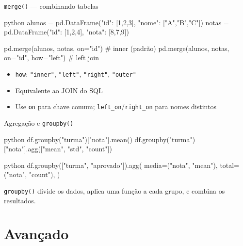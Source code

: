 \documentclass[xcolor=dvipsnames,t,aspectratio=169]{beamer}
\begin{document}
\begin{frame}[c, fragile]{\texttt{merge()} — combinando tabelas}

\begin{code}{python}
alunos   = pd.DataFrame({"id": [1,2,3], "nome": ["A","B","C"]})
notas    = pd.DataFrame({"id": [1,2,4], "nota": [8,7,9]})

pd.merge(alunos, notas, on="id")             # inner (padrão)
pd.merge(alunos, notas, on="id", how="left") # left join
\end{code}

\begin{itemize}
    \item \texttt{how}: \texttt{"inner"}, \texttt{"left"}, \texttt{"right"}, \texttt{"outer"}
    \item Equivalente ao JOIN do SQL
    \item Use \texttt{on} para chave comum; \texttt{left\_on}/\texttt{right\_on} para nomes distintos
\end{itemize}

\end{frame}


\begin{frame}[c, fragile]{Agregação e \texttt{groupby()}}

\begin{code}{python}
df.groupby("turma")["nota"].mean()
df.groupby("turma")["nota"].agg(["mean", "std", "count"])
\end{code}

\begin{code}{python}
df.groupby(["turma", "aprovado"]).agg(
    media=("nota", "mean"),
    total=("nota", "count"),
)
\end{code}

\begin{display}
\texttt{groupby()} divide os dados, aplica uma função a cada grupo, e combina os resultados.
\end{display}

\end{frame}


\section{Avançado}
\end{document}
